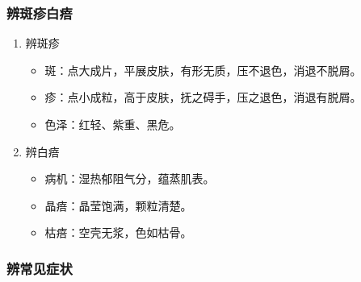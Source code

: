 \documentclass[cn,black,12pt,founder,normal,twocolumn]{elegantnote}
\begin{document}
\subsubsection{辨斑疹白{㾦}}

\begin{enumerate}
    \item 辨斑疹
    \begin{itemize}
        \item 斑：点大成片，平展皮肤，有形无质，压不退色，消退不脱屑。
        \item 疹：点小成粒，高于皮肤，抚之碍手，压之退色，消退有脱屑。
        \item 色泽：红轻、紫重、黑危。
    \end{itemize}
    \item {辨白㾦}
    \begin{itemize}
        \item 病机：湿热郁阻气分，蕴蒸肌表。
        \item {晶㾦}：晶莹饱满，颗粒清楚。
        \item {枯㾦}：空壳无浆，色如枯骨。
    \end{itemize}
\end{enumerate}

\subsubsection{辨常见症状}
\end{document}
